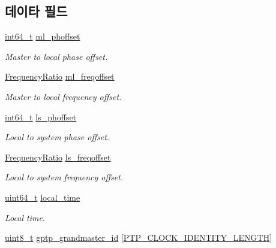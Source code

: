 \subsection*{데이타 필드}
\begin{DoxyCompactItemize}
\item 
\hyperlink{parse_8c_a67a9885ef4908cb72ce26d75b694386c}{int64\+\_\+t} \hyperlink{class_offset_a707b32410dd96584191405fcc6b1b10d}{ml\+\_\+phoffset}
\begin{DoxyCompactList}\small\item\em Master to local phase offset. \end{DoxyCompactList}\item 
\hyperlink{ptptypes_8hpp_a84de47dc2ed889ecd2b61706d3ad0f2e}{Frequency\+Ratio} \hyperlink{class_offset_aafeb4d0fa7d3cb53ee3686b804e47617}{ml\+\_\+freqoffset}
\begin{DoxyCompactList}\small\item\em Master to local frequency offset. \end{DoxyCompactList}\item 
\hyperlink{parse_8c_a67a9885ef4908cb72ce26d75b694386c}{int64\+\_\+t} \hyperlink{class_offset_a092b9f356daa2757877b51e4084366be}{ls\+\_\+phoffset}
\begin{DoxyCompactList}\small\item\em Local to system phase offset. \end{DoxyCompactList}\item 
\hyperlink{ptptypes_8hpp_a84de47dc2ed889ecd2b61706d3ad0f2e}{Frequency\+Ratio} \hyperlink{class_offset_a396f365f5e7c66610f076359c5d99c6e}{ls\+\_\+freqoffset}
\begin{DoxyCompactList}\small\item\em Local to system frequency offset. \end{DoxyCompactList}\item 
\hyperlink{parse_8c_aec6fcb673ff035718c238c8c9d544c47}{uint64\+\_\+t} \hyperlink{class_offset_a77a3c33b68032d5db3c0c556a80ef651}{local\+\_\+time}
\begin{DoxyCompactList}\small\item\em Local time. \end{DoxyCompactList}\item 
\hyperlink{stdint_8h_aba7bc1797add20fe3efdf37ced1182c5}{uint8\+\_\+t} \hyperlink{class_offset_a3545e41943aa3080a0817fb8a49fd34c}{gptp\+\_\+grandmaster\+\_\+id} \mbox{[}\hyperlink{windows__ipc_8hpp_afd1566058ed7927c2b790c9d4a0051ec}{P\+T\+P\+\_\+\+C\+L\+O\+C\+K\+\_\+\+I\+D\+E\+N\+T\+I\+T\+Y\+\_\+\+L\+E\+N\+G\+TH}\mbox{]}

\end{DoxyCompactItemize}
